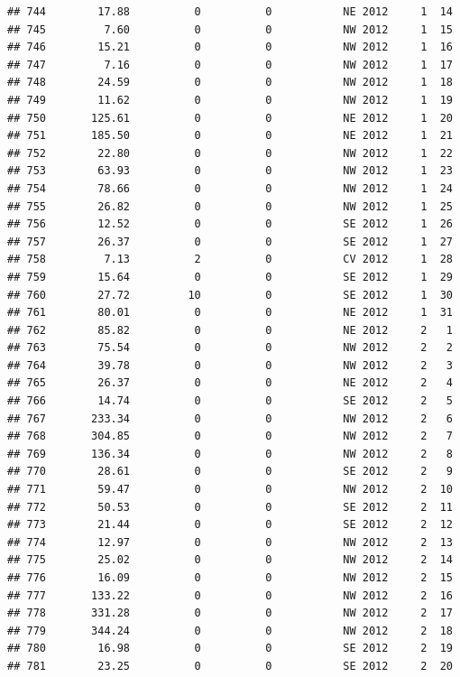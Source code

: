 \documentclass[
]{article}
\begin{document}
\begin{verbatim}
## 744        17.88          0          0           NE 2012     1  14
## 745         7.60          0          0           NW 2012     1  15
## 746        15.21          0          0           NW 2012     1  16
## 747         7.16          0          0           NW 2012     1  17
## 748        24.59          0          0           NW 2012     1  18
## 749        11.62          0          0           NW 2012     1  19
## 750       125.61          0          0           NE 2012     1  20
## 751       185.50          0          0           NE 2012     1  21
## 752        22.80          0          0           NW 2012     1  22
## 753        63.93          0          0           NW 2012     1  23
## 754        78.66          0          0           NW 2012     1  24
## 755        26.82          0          0           NW 2012     1  25
## 756        12.52          0          0           SE 2012     1  26
## 757        26.37          0          0           SE 2012     1  27
## 758         7.13          2          0           CV 2012     1  28
## 759        15.64          0          0           SE 2012     1  29
## 760        27.72         10          0           SE 2012     1  30
## 761        80.01          0          0           NE 2012     1  31
## 762        85.82          0          0           NE 2012     2   1
## 763        75.54          0          0           NW 2012     2   2
## 764        39.78          0          0           NW 2012     2   3
## 765        26.37          0          0           NE 2012     2   4
## 766        14.74          0          0           SE 2012     2   5
## 767       233.34          0          0           NW 2012     2   6
## 768       304.85          0          0           NW 2012     2   7
## 769       136.34          0          0           NW 2012     2   8
## 770        28.61          0          0           SE 2012     2   9
## 771        59.47          0          0           NW 2012     2  10
## 772        50.53          0          0           SE 2012     2  11
## 773        21.44          0          0           SE 2012     2  12
## 774        12.97          0          0           NW 2012     2  13
## 775        25.02          0          0           NW 2012     2  14
## 776        16.09          0          0           NW 2012     2  15
## 777       133.22          0          0           NW 2012     2  16
## 778       331.28          0          0           NW 2012     2  17
## 779       344.24          0          0           NW 2012     2  18
## 780        16.98          0          0           SE 2012     2  19
## 781        23.25          0          0           SE 2012     2  20

\end{verbatim}
\end{document}
